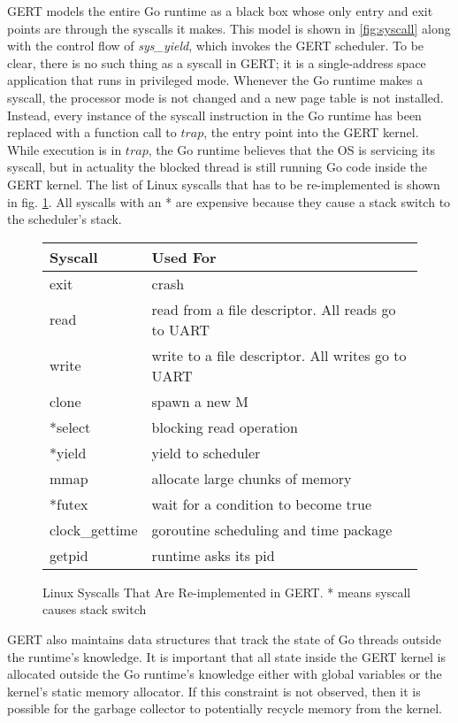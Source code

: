 GERT models the entire Go runtime as a black box whose only entry and exit points
are through the syscalls it makes. This model is shown in \ref{fig:syscall} along with the
control flow of \textit{sys\_yield}, which invokes the GERT scheduler. To be clear, there is no such thing as a syscall in GERT;
it is a single-address space application that runs in privileged mode.
Whenever the Go runtime makes a syscall, the processor mode is not changed and a new page table
is not installed. Instead, every instance of the syscall instruction in the Go runtime has been
replaced with a function call to $trap$, the entry point into the GERT kernel.
While execution is in $trap$, the Go runtime believes
that the OS is servicing its syscall, but in actuality the blocked thread is still running Go code inside
the GERT kernel. The list of Linux syscalls that has to be re-implemented is shown in fig. \ref{fig:syscalls}.
All syscalls with an * are expensive because they cause a stack switch to the scheduler's stack.


\begin{figure} [h]
\begin{center}
  \begin{tabular}{ | l | l |}
    \hline
    Syscall & Used For \\ \hline
    exit & crash \\ \hline
    read & read from a file descriptor. All reads go to UART\\ \hline
    write & write to a file descriptor. All writes go to UART\\ \hline
    clone & spawn a new M\\ \hline
    *select & blocking read operation\\ \hline
    *yield & yield to scheduler\\ \hline
    mmap & allocate large chunks of memory\\ \hline
    *futex & wait for a condition to become true\\ \hline
    clock\_gettime & goroutine scheduling and time package\\ \hline
    getpid & runtime asks its pid\\ \hline
  \end{tabular}
\end{center}
  \caption{Linux Syscalls That Are Re-implemented in GERT. * means syscall causes stack switch}  \label{fig:syscalls}
\end{figure}

GERT also maintains data structures that track the state of Go threads
outside the runtime's knowledge. It is important that all state inside the GERT kernel is
allocated outside the Go runtime's knowledge either with global variables or the kernel's
static memory allocator. If this constraint is not observed, then it is possible for the garbage collector
to potentially recycle memory from the kernel.

